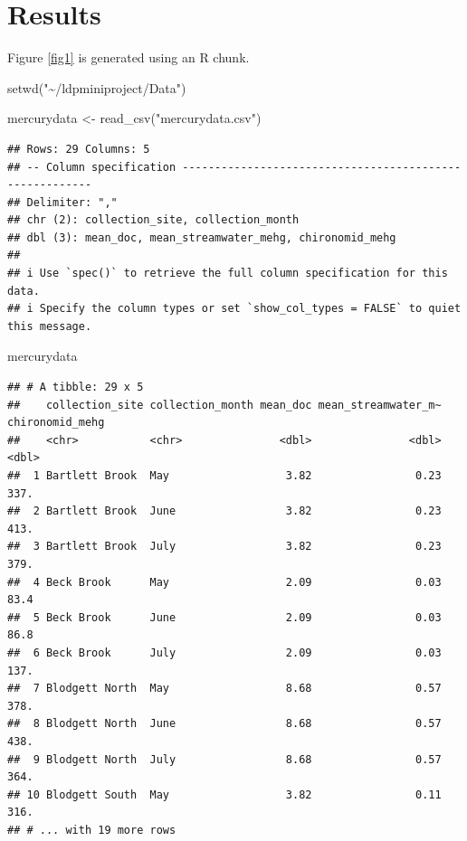 \documentclass[preprint, 3p,
authoryear]{elsarticle} %
\newenvironment{Shaded}{\begin{snugshade}}{\end{snugshade}}
\newcommand{\FunctionTok}[1]{\textcolor[rgb]{0.00,0.00,0.00}{#1}}
\newcommand{\NormalTok}[1]{#1}
\newcommand{\OtherTok}[1]{\textcolor[rgb]{0.56,0.35,0.01}{#1}}
\newcommand{\StringTok}[1]{\textcolor[rgb]{0.31,0.60,0.02}{#1}}
\begin{document}
\hypertarget{results}{%
\section{Results}\label{results}}

Figure \ref{fig1} is generated using an R chunk.

\begin{Shaded}
\begin{Highlighting}[]
\FunctionTok{setwd}\NormalTok{(}\StringTok{"\textasciitilde{}/ldpminiproject/Data"}\NormalTok{)}

\NormalTok{mercurydata }\OtherTok{\textless{}{-}} \FunctionTok{read\_csv}\NormalTok{(}\StringTok{"mercurydata.csv"}\NormalTok{)}
\end{Highlighting}
\end{Shaded}

\begin{verbatim}
## Rows: 29 Columns: 5
## -- Column specification --------------------------------------------------------
## Delimiter: ","
## chr (2): collection_site, collection_month
## dbl (3): mean_doc, mean_streamwater_mehg, chironomid_mehg
## 
## i Use `spec()` to retrieve the full column specification for this data.
## i Specify the column types or set `show_col_types = FALSE` to quiet this message.
\end{verbatim}

\begin{Shaded}
\begin{Highlighting}[]
\NormalTok{mercurydata}
\end{Highlighting}
\end{Shaded}

\begin{verbatim}
## # A tibble: 29 x 5
##    collection_site collection_month mean_doc mean_streamwater_m~ chironomid_mehg
##    <chr>           <chr>               <dbl>               <dbl>           <dbl>
##  1 Bartlett Brook  May                  3.82                0.23           337. 
##  2 Bartlett Brook  June                 3.82                0.23           413. 
##  3 Bartlett Brook  July                 3.82                0.23           379. 
##  4 Beck Brook      May                  2.09                0.03            83.4
##  5 Beck Brook      June                 2.09                0.03            86.8
##  6 Beck Brook      July                 2.09                0.03           137. 
##  7 Blodgett North  May                  8.68                0.57           378. 
##  8 Blodgett North  June                 8.68                0.57           438. 
##  9 Blodgett North  July                 8.68                0.57           364. 
## 10 Blodgett South  May                  3.82                0.11           316. 
## # ... with 19 more rows
\end{verbatim}
\end{document}

